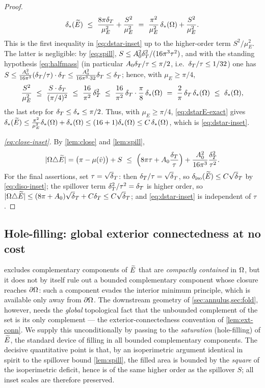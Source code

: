 \begin{proof}
\begin{equation}
   \delta_{*}(\widetilde{E})
   \ \le\ \frac{8\pi\delta_T}{\mu_E^2}+\frac{S^2}{\mu_E^2}
   \ =\ \frac{\pi^2}{\mu_E^2}\,\delta_{*}(\Omega)+\frac{S^2}{\mu_E^2}.
\end{equation}
This is the first inequality in \eqref{eq:dstar-inset} up to the higher-order
term $S^2/\mu_E^2$. The latter is negligible: by \eqref{eq:spill},
$S\le A_0^2\delta_T^2/(16\pi^3\tau^2)$, and with the standing hypothesis
\eqref{eq:halfmass} (in particular $A_0\delta_T/\tau\le\pi/2$, i.e.\
$\delta_T/\tau\le1/32$) one has $S\le\tfrac{A_0^2}{16\pi^3}(\delta_T/\tau)\cdot\delta_T
\le\tfrac{A_0^2}{16\pi^3\cdot32}\delta_T\le\delta_T$; hence, with $\mu_E\ge\pi/4$,
\[
   \frac{S^2}{\mu_E^2}\ \le\ \frac{S\cdot\dT}{(\pi/4)^2}
   \ \le\ \frac{16}{\pi^2}\,\dT^2
   \ \le\ \frac{16}{\pi^2}\,\dT\cdot\frac\pi8\,\dstar(\Om)
   \ =\ \frac{2}{\pi}\,\dT\,\dstar(\Om)\ \le\ \dstar(\Om),
\]
the last step for $\delta_T\le\delta_\star\le\pi/2$. Thus, with $\mu_E\ge\pi/4$,
\eqref{eq:dstarE-exact} gives
$\delta_{*}(\widetilde{E})\le\frac{\pi^2}{\mu_E^2}\delta_{*}(\Omega)+\delta_{*}(\Omega)
\le(16+1)\delta_{*}(\Omega)\le C\,\delta_{*}(\Omega)$, which is \eqref{eq:dstar-inset}.

\emph{\eqref{eq:close-inset}.} By \cref{lem:close} and \cref{lem:spill},
\[
   |\Om\triangle\Etil|=\bigl(\pi-\mu(\hat v)\bigr)+S
   \ \le\ \Bigl(8\pi\tau+A_0\frac\dT\tau\Bigr)+\frac{A_0^2}{16\pi^3}\frac{\dT^2}{\tau^2}.
\]
For the final assertions, set $\tau=\sqrt\dT$: then $\dT/\tau=\sqrt\dT$, so
$\diso(\Etil)\le C\sqrt\dT$ by \eqref{eq:diso-inset}; the spillover term
$\delta_T^2/\tau^2=\delta_T$ is higher order, so $|\Om\triangle\Etil|\le(8\pi+A_0)
\sqrt\dT+C\dT\le C\sqrt\dT$; and \eqref{eq:dstar-inset} is independent of
$\tau$.
\end{proof}

\subsection{Hole-filling: global exterior connectedness at no cost}
\label{ss:fill}

 excludes complementary components of $\widetilde{E}$ that are
\emph{compactly contained} in $\Omega$, but it does not by itself rule out a
bounded complementary component whose closure reaches $\partial\Omega$: such a
component evades the interior minimum principle, which is available only away
from $\partial\Omega$. The downstream geometry of \cref{sec:annulus,sec:fold},
however, needs the \emph{global} topological fact that the unbounded
complement of the set is its only complement --- the exterior-connectedness
convention of \cref{lem:ext-conn}. We supply this unconditionally by passing
to the \emph{saturation} (hole-filling) of $\widetilde{E}$, the standard device of
filling in all bounded complementary components. The decisive quantitative
point is that, by an isoperimetric argument identical in spirit to the
spillover bound \cref{lem:spill}, the filled area is bounded by the
\emph{square} of the isoperimetric deficit, hence is of the same higher order
as the spillover $S$; all inset scales are therefore preserved.

